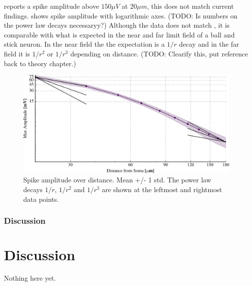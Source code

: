 \documentclass[altfont, fleqn]{uiophd}
\renewcommand{\cref}[1]{{\color{viridis_03}\mycref{#1}} }
\begin{document}
\textcite{pettersen_amplitude_2008} reports a spike amplitude above $150\mu V$ at 
$20\mu m$, this does not match current findings.  
\cref{fig:3_1_spike_amp} shows spike amplitude with logarithmic axes.  
(TODO: Is numbers on the power law decays necessaryy?) Although 
the data does not match \textcite{pettersen_amplitude_2008}, 
it is comparable with what is
expected in the near and far limit field of a ball and stick neuron.
In the near field the the expectation is a $1/r$ decay and in the far field
it is  $1/r^2$ or $1/r^3$ depending on distance. (TODO: Clearify this, put reference
back to theory chapter.)

\begin{figure}[thp]
\centering
\includegraphics[width=\textwidth]{images/3_methods/3_1_reproduction/circular_spike_amp_std_log.pdf}
\caption{Spike amplitude over distance. Mean +/- 1 std. The power law
decays $1/r$, $1/r^2$ and $1/r^3$ are shown at the leftmost and rightmost
data points.}
\label{fig:3_1_spike_amp}
\end{figure}

\subsection{Discussion}


\chapter{Discussion}
Nothing here yet.
\end{document}
